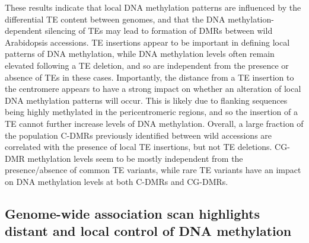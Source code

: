 \documentclass[12pt]{article}
\begin{document}
These results indicate that local DNA methylation patterns are
influenced by the differential TE content between genomes, and that the
DNA methylation-dependent silencing of TEs may lead to formation of DMRs
between wild Arabidopsis accessions. TE insertions appear to be
important in defining local patterns of DNA methylation, while DNA
methylation levels often remain elevated following a TE deletion, and so
are independent from the presence or absence of TEs in these cases.
Importantly, the distance from a TE insertion to the centromere appears
to have a strong impact on whether an alteration of local DNA
methylation patterns will occur. This is likely due to flanking
sequences being highly methylated in the pericentromeric regions, and so
the insertion of a TE cannot further increase levels of DNA methylation.
Overall, a large fraction of the population C-DMRs previously identified
between wild accessions are correlated with the presence of local TE
insertions, but not TE deletions. CG-DMR methylation levels seem to be
mostly independent from the presence/absence of common TE variants,
while rare TE variants have an impact on DNA methylation levels at both
C-DMRs and CG-DMRs.

\subsection{Genome-wide association scan highlights
  distant and local control of DNA methylation} 
\end{document}
